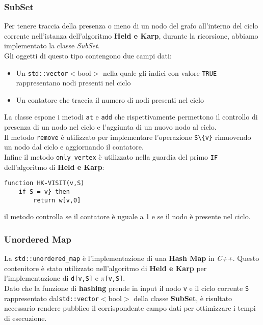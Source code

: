 \documentclass[]{article}
\begin{document}
\subsubsection{SubSet}
\begin{flushleft}
Per tenere traccia della presenza o meno di un nodo del grafo all'interno del ciclo corrente nell'istanza dell'algoritmo \textbf{Held e Karp}, durante la ricorsione, abbiamo implementato la classe \textit{SubSet}.\\
Gli oggetti di questo tipo contengono due campi dati:
\begin{itemize}
	\item Un \verb|std::vector|$<$bool$>$ nella quale gli indici con valore \verb|TRUE| rappresentano nodi presenti nel ciclo
	\item Un contatore che traccia il numero di nodi presenti nel ciclo
\end{itemize}

La classe espone i metodi \verb|at| e \verb|add| che rispettivamente permettono il controllo di presenza di un nodo nel ciclo e l'aggiunta di un nuovo nodo al ciclo.\\
Il metodo \verb|remove| è utilizzato per implementare l'operazione \verb|S\{v}| rimuovendo un nodo dal ciclo e aggiornando il contatore.\\
Infine il metodo \verb|only_vertex| è utilizzato nella guardia del primo \verb|IF| dell'algoritmo di \textbf{Held e Karp}:
\begin{lstlisting}[mathescape=true]
function HK-VISIT(v,S)
	if S = v} then
		return w[v,0]
\end{lstlisting}
il metodo controlla se il contatore è uguale a 1 e se il nodo è presente nel ciclo.
\end{flushleft}
\subsubsection{Unordered Map}
La \verb|std::unordered_map| è l'implementazione di una \textbf{Hash Map} in \textit{C++}. Questo contenitore è stato utilizzato nell'algoritmo di \textbf{Held e Karp} per l'implementazione di \verb|d[v,S]| e $\pi$\verb|[v,S]|.\\
Dato che la funzione di \textbf{hashing} prende in input il nodo \verb|v| e il ciclo corrente \verb|S| rappresentato dal\verb|std::vector|$<$bool$>$ della classe \textbf{SubSet}, è risultato necessario rendere pubblico il corrispondente campo dati per ottimizzare i tempi di esecuzione.
\end{document}
